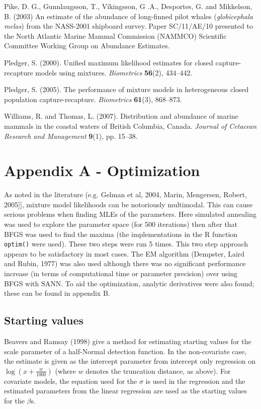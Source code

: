 \documentclass[useAMS,referee, usegraphicx]{biom}
\begin{document}
\begin{thebibliography}{}
\bibitem{ } Pike, D. G., Gunnlaugsson, T., V\'{i}kingsson, G .A., Desportes, G. and Mikkelson, B.  (2003) An estimate of the abundance of long-finned pilot whales (\textit{globicephala melas}) from the NASS-2001 shipboard survey. Paper SC/11/AE/10 presented to the North Atlantic Marine Mammal Commission (NAMMCO) Scientific Committee Working Group on Abundance Estimates.

\bibitem{ } Pledger, S. (2000). Unified maximum likelihood estimates for closed capture-recapture models using mixtures. \textit{Biometrics} \textbf{56}(2), 434--442. 

\bibitem{ } Pledger, S. (2005). The performance of mixture models in heterogeneous closed population capture-recapture. \textit{Biometrics} \textbf{61}(3), 868--873.

\bibitem{ } Williams, R. and Thomas, L. (2007). Distribution and abundance of marine mammals in the coastal waters of British Columbia, Canada. \textit{Journal of Cetacean Research and Management} \textbf{9}(1), pp. 15--38.

\end{thebibliography}


\section*{Appendix A - Optimization}
\label{s:optimization}

As noted in the literature (e.g. Gelman et al, 2004, Marin, Mengersen, Robert, 2005]], mixture model likelihoods can be notoriously multimodal. This can cause serious problems when finding MLEs of the parameters. Here simulated annealing was used to explore the parameter space (for 500 iterations) then after that BFGS was used to find the maxima (the implementations in the \textsf{R} function \texttt{optim()} were used). These two steps were run 5 times. This two step approach appears to be satisfactory in most cases. The EM algorithm (Dempster, Laird and Rubin, 1977) was also used although there was no significant performance increase (in terms of computational time or parameter precision) over using BFGS with SANN. To aid the optimization, analytic derivatives were also found; these can be found in appendix B.

\subsection{Starting values}
Beavers and Ramsay (1998) give a method for estimating starting values for the scale parameter of a half-Normal detection function. In the non-covariate case, the estimate is given as the intercept parameter from intercept only regression on $\log(x+\frac{w}{1000})$ (where $w$ denotes the truncation distance, as above). For covariate models, the equation used for the $\sigma$ is used in the regression and the estimated parameters from the linear regression are used as the starting values for the $\beta$s.
\end{document}
